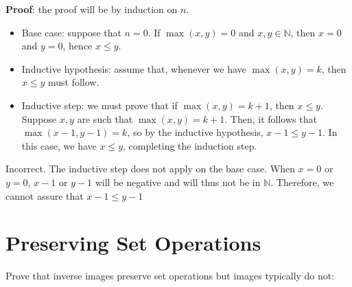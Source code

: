\documentclass[11pt]{article}
\newcommand*{\Question}[1]{\vfill\pagebreak[3]\section{#1}}
\newenvironment{Parts}{\begin{enumerate}[label=(\alph*)]}{\end{enumerate}}
\newenvironment{Answer}{\vspace{20pt}}{\vspace{20pt}}
\newcommand*{\N}{\mathbb{N}}
\begin{document}
\begin{Parts}
\textbf{Proof}: the proof will be by induction on $n$.
\begin{itemize}
\item Base case: suppose that $n=0$. If $\max(x,y)=0$ and $x,y\in\N$, then $x=0$ and $y=0$, hence $x\leq y$.
\item Inductive hypothesis: assume that, whenever we have $\max(x,y)=k$, then $x\leq y$ must follow.
\item Inductive step: we must prove that if $\max(x,y)=k+1$, then $x\leq y$. Suppose $x,y$ are such that $\max(x,y)=k+1$. Then, it follows that $\max(x-1,y-1)=k$, so by the inductive hypothesis, $x-1\leq y-1$. In this case, we have $x\leq y$, completing the induction step.
\end{itemize}

\begin{Answer}
Incorrect. The inductive step does not apply on the base case. When $x=0$ or $y=0$, $x-1$ or $y-1$ will be negative and will thus not be in $\N$. Therefore, we cannot assure that $x-1 \leq y-1$

\end{Answer}

\end{Parts}


\Question{Preserving Set Operations}

Prove that inverse images preserve set operations but images typically do not:
\end{document}
